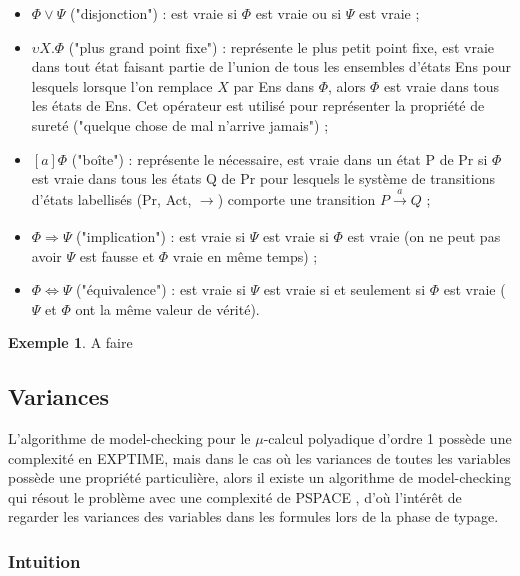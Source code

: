 \documentclass[11pt,a4paper]{article}
\theoremstyle{plain}
\theoremstyle{remark}
\theoremstyle{definition}
\newtheorem{exem}{Exemple}
\begin{document}
\begin{itemize}
  \item $\Phi \vee \Psi$ ("disjonction") : est vraie si $\Phi$ est vraie ou si $\Psi$ est vraie ;
  \item $\upsilon X . \Phi$ ("plus grand point fixe") : représente le plus petit point fixe, est vraie dans tout état faisant partie de l'union de tous les ensembles d'états Ens pour lesquels lorsque l'on remplace $X$ par Ens dans $\Phi$, alors $\Phi$ est vraie dans tous les états de Ens. Cet opérateur est utilisé pour représenter la propriété de sureté ("quelque chose de mal n'arrive jamais") ;
  \item $[a] \Phi$ ("boîte") : représente le nécessaire, est vraie dans un état P de Pr si $\Phi$ est vraie dans tous les états Q de Pr pour lesquels le système de transitions d'états labellisés (Pr, Act, $\rightarrow$) comporte une transition $P\xrightarrow[]{a} Q$ ;
  \item $\Phi \Rightarrow \Psi$ ("implication") : est vraie si $\Psi$ est vraie si $\Phi$ est vraie (on ne peut pas avoir $\Psi$ est fausse et $\Phi$ vraie en même temps) ;  
  \item $\Phi \Leftrightarrow \Psi$ ("équivalence") : est vraie si $\Psi$ est vraie si et seulement si $\Phi$ est vraie ($\Psi$ et $\Phi$ ont la même valeur de vérité).
\end{itemize}

\begin{exem}
A faire	
\end{exem}

\subsection{Variances}

L'algorithme de model-checking pour le $\mu$-calcul polyadique d'ordre 1 possède une complexité en EXPTIME, mais dans le cas où les variances de toutes les variables possède une propriété particulière, alors il existe un algorithme de model-checking qui résout le problème avec une complexité de PSPACE \cite{lange2014model}, d'où l'intérêt de regarder les variances des variables dans les formules lors de la phase de typage.     

\subsubsection{Intuition}
\end{document}
